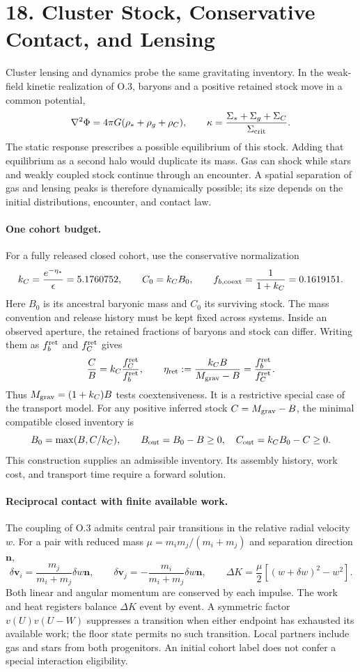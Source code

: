 \section{18. Cluster Stock, Conservative Contact, and Lensing}
\label{sec:clusterstock}

Cluster lensing and dynamics probe the same gravitating inventory. In the
weak-field kinetic realization of O.3, baryons and a positive retained stock
move in a common potential,
\[
\nabla^2\Phi=4\pi G(\rho_*+\rho_g+\rho_C),\qquad
\kappa=\frac{\Sigma_*+\Sigma_g+\Sigma_C}{\Sigma_{\rm crit}}.
\]
The static response prescribes a possible equilibrium of this stock.
Adding that equilibrium as a second halo would duplicate its mass.
Gas can shock while stars and weakly coupled stock continue through an
encounter. A spatial separation of gas and lensing peaks is therefore
dynamically possible; its size depends on the initial distributions,
encounter, and contact law.

\paragraph{One cohort budget.}
For a fully released closed cohort, use the conservative normalization
\[
k_C=\frac{e^{-\eta_*}}{\epsilon}=5.1760752,\qquad C_0=k_C B_0,
\qquad f_{b,\rm coext}=\frac1{1+k_C}=0.1619151.
\]
Here $B_0$ is its ancestral baryonic mass and $C_0$ its surviving stock.
The mass convention and release history must be kept fixed across systems.
Inside an observed aperture, the retained fractions of baryons and stock
can differ. Writing them as $f_b^{\rm ret}$ and $f_C^{\rm ret}$ gives
\[
\frac{C}{B}=k_C\frac{f_C^{\rm ret}}{f_b^{\rm ret}},\qquad
\eta_{\rm ret}:=\frac{k_C B}{M_{\rm grav}-B}
=\frac{f_b^{\rm ret}}{f_C^{\rm ret}}.
\]
Thus $M_{\rm grav}=(1+k_C)B$ tests coextensiveness. It is a restrictive
special case of the transport model. For any positive inferred stock
$C=M_{\rm grav}-B$, the minimal compatible closed inventory is
\[
B_0=\max(B,C/k_C),\qquad
B_{\rm out}=B_0-B\ge0,\quad C_{\rm out}=k_CB_0-C\ge0.
\]
This construction supplies an admissible inventory. Its assembly history,
work cost, and transport time require a forward solution.

\paragraph{Reciprocal contact with finite available work.}
The coupling of O.3 admits central pair transitions in the relative
radial velocity $w$. For a pair with reduced mass
$\mu=m_im_j/(m_i+m_j)$ and separation direction $\boldsymbol n$,
\[
\delta\boldsymbol v_i=\frac{m_j}{m_i+m_j}\delta w\boldsymbol n,
\qquad
\delta\boldsymbol v_j=-\frac{m_i}{m_i+m_j}\delta w\boldsymbol n,
\qquad
\Delta K=\frac\mu2[(w+\delta w)^2-w^2].
\]
Both linear and angular momentum are conserved by each impulse. The work
and heat registers balance $\Delta K$ event by event. A symmetric factor
$v(U)v(U-W)$ suppresses a transition when either endpoint has exhausted
its available work; the floor state permits no such transition. Local
partners include gas and stars from both progenitors. An initial cohort
label does not confer a special interaction eligibility.

